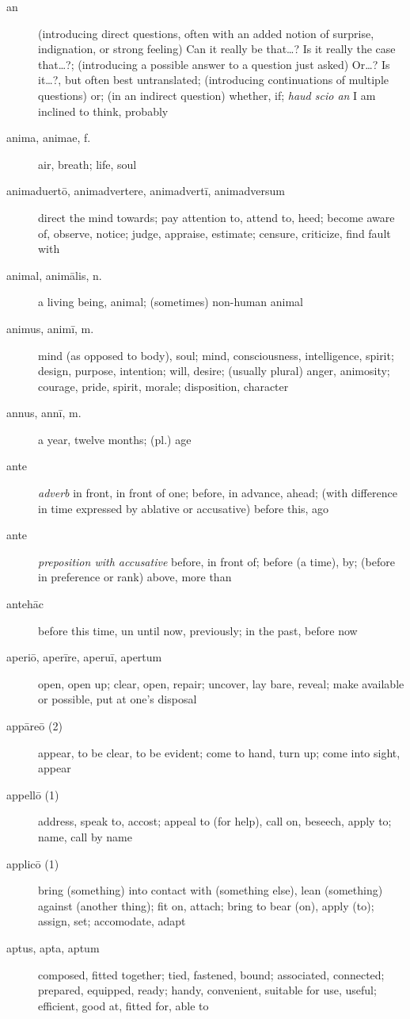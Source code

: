 \begin{description}
    \item[an] (introducing direct questions, often with an added notion of surprise, indignation, or strong feeling) Can it really be that\dots ? Is it really the case that\dots ?; (introducing a possible answer to a question just asked) Or\dots? Is it\dots?, but often best untranslated; (introducing continuations of multiple questions) or; (in an indirect question) whether, if; \textit{haud scio an} I am inclined to think, probably
    \item[anima, animae, f.] air, breath; life, soul
    \item[animaduertō, animadvertere, animadvertī, animadversum] direct the mind towards; pay attention to, attend to, heed; become aware of, observe, notice; judge, appraise, estimate; censure, criticize, find fault with
    \item[animal, animālis, n.] a living being, animal; (sometimes) non-human animal
    \item[animus, animī, m.] mind (as opposed to body), soul; mind, consciousness, intelligence, spirit; design, purpose, intention; will, desire; (usually plural) anger, animosity; courage, pride, spirit, morale; disposition, character
    \item[annus, annī, m.] a year, twelve months; (pl.) age
    \item[ante] \textit{adverb} in front, in front of one; before, in advance, ahead; (with difference in time expressed by ablative or accusative) before this, ago
    \item[ante] \textit{preposition with accusative} before, in front of; before (a time), by; (before in preference or rank) above, more than
    \item[antehāc] before this time, un until now, previously; in the past, before now
    \item[aperiō, aperīre, aperuī, apertum] open, open up; clear, open, repair; uncover, lay bare, reveal; make available or possible, put at one's disposal
    \item[appāreō (2)] appear, to be clear, to be evident; come to hand, turn up; come into sight, appear
    \item[appellō (1)]  address, speak to, accost; appeal to (for help), call on, beseech, apply to; name, call by name
    \item[applicō (1)] bring (something) into contact with (something else), lean (something) against (another thing); fit on, attach; bring to bear (on), apply (to); assign, set; accomodate, adapt
    \item[aptus, apta, aptum] composed, fitted together; tied, fastened, bound; associated, connected; prepared, equipped, ready; handy, convenient, suitable for use, useful; efficient, good at, fitted for, able to

\end{description}
